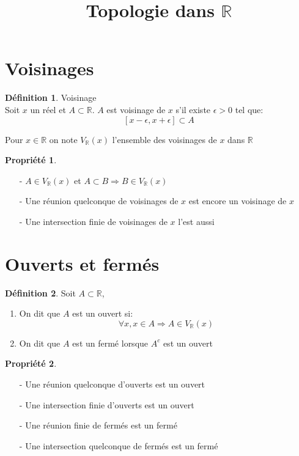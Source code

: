 \documentclass[fleqn]{article}
\title{Topologie dans $\mathbb{R}$}
\date{}
\theoremstyle{definition} \newtheorem*{defi}{D\'efinition}
\theoremstyle{definition} \newtheorem*{theo}{Th\'eor\`eme}
\theoremstyle{definition} \newtheorem*{adh}{Caract\'erisation s\'equentielle de l'adh\'erence}
\theoremstyle{definition} \newtheorem*{prop}{Propri\'et\'e}
\theoremstyle{definition} \newtheorem*{fermitude}{Caract\'erisation s\'equentielle de la fermitude}
\begin{document}
\maketitle

\section{Voisinages}
\begin{defi} Voisinage \\
	Soit $x$ un r\'eel et $A \subset \mathbb{R}$. $A$ est voisinage de $x$ s'il existe $\epsilon > 0$ tel que:
	\[[x-\epsilon, x+\epsilon] \subset A\]
\end{defi}
Pour $x \in \mathbb{R}$ on note $V_\mathbb{R}(x)$ l'ensemble des voisinages de $x$ dans $\mathbb{R}$

\begin{prop} $ $
	\begin{itemize}
		\item [-] $A \in V_\mathbb{R}(x)$ et $A \subset B \Rightarrow B \in V_\mathbb{R}(x)$
		\item [-] Une r\'eunion quelconque de voisinages de $x$ est encore un voisinage de $x$
		\item [-] Une intersection finie de voisinages de $x$ l'est aussi
	\end{itemize}
\end{prop}

\section{Ouverts et ferm\'es}
\begin{defi}
	Soit $A \subset \mathbb{R}$,
	\begin{enumerate}
		\item On dit que $A$ est un ouvert si:
			\[\forall x, x \in A \Rightarrow A \in V_\mathbb{R}(x)\]
		\item On dit que $A$ est un ferm\'e lorsque $A^c$ est un ouvert
	\end{enumerate}
\end{defi}

\begin{prop} $ $
	\begin{itemize}
		\item [-] Une r\'eunion quelconque d'ouverts est un ouvert
		\item [-] Une intersection finie d'ouverts est un ouvert
		\item [-] Une r\'eunion finie de ferm\'es est un ferm\'e
		\item [-] Une intersection quelconque de ferm\'es est un ferm\'e
	\end{itemize}
\end{prop}
\end{document}
